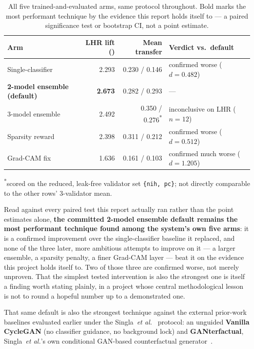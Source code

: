 \begin{table}[h]
\centering
\caption{All five trained-and-evaluated arms, same protocol throughout.
Bold marks the most performant technique by the evidence this report
holds itself to --- a paired significance test or bootstrap CI, not a
point estimate.}
\label{tab:conclusion_five_arm}
\begin{tabular}{@{}lrrl@{}}
\toprule
\textbf{Arm} & \textbf{LHR lift (\pton{})} & \textbf{Mean transfer} & \textbf{Verdict vs.\ default} \\
\midrule
Single-classifier            & 2.293          & 0.230 / 0.146 & confirmed worse ($d=0.482$) \\
\textbf{2-model ensemble (default)} & \textbf{2.673} & 0.282 / 0.293 & --- \\
3-model ensemble             & 2.492          & 0.350 / 0.276\textsuperscript{*} & inconclusive on LHR ($n=12$) \\
Sparsity reward              & 2.398          & 0.311 / 0.212 & confirmed worse ($d=0.512$) \\
Grad-CAM fix                 & 1.636          & 0.161 / 0.103 & confirmed much worse ($d=1.205$) \\
\bottomrule
\end{tabular}

\vspace{0.3em}
\footnotesize\textsuperscript{*}scored on the reduced, leak-free validator
set \texttt{\{nih, pc\}}; not directly comparable to the other rows' 3-validator mean.
\end{table}

Read against every paired test this report actually ran rather than the
point estimates alone, \textbf{the committed 2-model ensemble default
remains the most performant technique found among the system's own five
arms}: it is a confirmed improvement over the single-classifier baseline
it replaced, and none of the three later, more ambitious attempts to
improve on it --- a larger ensemble, a sparsity penalty, a finer Grad-CAM
layer --- beat it on the evidence this project holds itself to. Two of
those three are confirmed worse, not merely unproven. That the simplest
tested intervention is also the strongest one is itself a finding worth
stating plainly, in a project whose central methodological lesson is not
to round a hopeful number up to a demonstrated one.

That same default is also the strongest technique against the external
prior-work baselines evaluated earlier under the Singla~\emph{et
al.}~\cite{singla2022} protocol: an unguided \textbf{Vanilla CycleGAN}
(no classifier guidance, no background lock) and \textbf{GANterfactual},
Singla~\emph{et al.}'s own conditional GAN-based counterfactual
generator~\cite{singla2022}.

